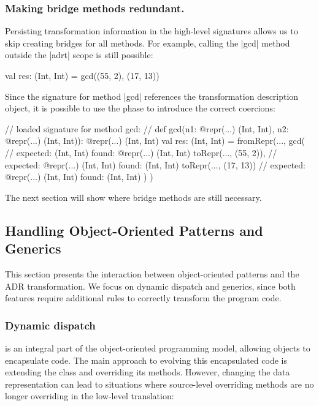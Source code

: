 \subsubsection{Making bridge methods redundant.} Persisting transformation information in the high-level signatures allows us to skip creating bridges for all methods. For example, calling the |gcd| method outside the |adrt| scope is still possible:

\begin{lstlisting-nobreak}
val res: (Int, Int) = gcd((55, 2), (17, 13))
\end{lstlisting-nobreak}

Since the signature for method |gcd| references the transformation description object, it is possible to use the \coerce{} phase to introduce the correct coercions:

\begin{lstlisting-nobreak}
// loaded signature for method gcd:
//  def gcd(n1: @repr(...) (Int, Int), n2: @repr(...) (Int, Int)): @repr(...) (Int, Int)
val res: (Int, Int) =
  fromRepr(...,
    gcd(                           // expected: (Int, Int) found: @repr(...) (Int, Int)
      toRepr(..., (55, 2)),   // expected: @repr(...) (Int, Int) found: (Int, Int)
      toRepr(..., (17, 13))  // expected: @repr(...) (Int, Int) found: (Int, Int)
    )
  )
\end{lstlisting-nobreak}

The next section will show where bridge methods are still necessary.


\subsection{Handling Object-Oriented Patterns and Generics}
\label{sec:ildl:generics}

This section presents the interaction between object-oriented patterns and the ADR transformation. We focus on dynamic dispatch and generics, since both features require additional rules to correctly transform the program code.

\subsubsection{Dynamic dispatch}
is an integral part of the object-oriented programming model, allowing objects to encapsulate code. The main approach to evolving this encapsulated code is extending the class and overriding its methods. However, changing the data representation can lead to situations where source-level overriding methods are no longer overriding in the low-level translation:


